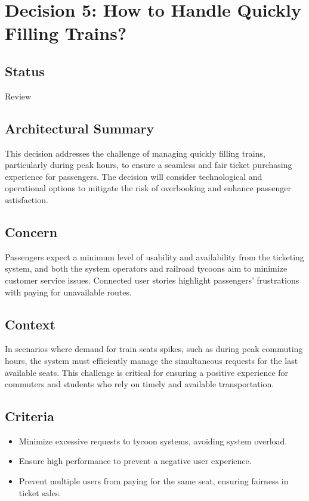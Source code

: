 \section*{Decision 5: How to Handle Quickly Filling Trains?}

\subsection*{Status}
Review

\subsection*{Architectural Summary}
This decision addresses the challenge of managing quickly filling trains, particularly during peak hours, to ensure a seamless and fair ticket purchasing experience for passengers. The decision will consider technological and operational options to mitigate the risk of overbooking and enhance passenger satisfaction.

\subsection*{Concern}
Passengers expect a minimum level of usability and availability from the ticketing system, and both the system operators and railroad tycoons aim to minimize customer service issues. Connected user stories highlight passengers' frustrations with paying for unavailable routes.

\subsection*{Context}
In scenarios where demand for train seats spikes, such as during peak commuting hours, the system must efficiently manage the simultaneous requests for the last available seats. This challenge is critical for ensuring a positive experience for commuters and students who rely on timely and available transportation.

\subsection*{Criteria}
\begin{itemize}
    \item Minimize excessive requests to tycoon systems, avoiding system overload.
    \item Ensure high performance to prevent a negative user experience.
    \item Prevent multiple users from paying for the same seat, ensuring fairness in ticket sales.
\end{itemize}

